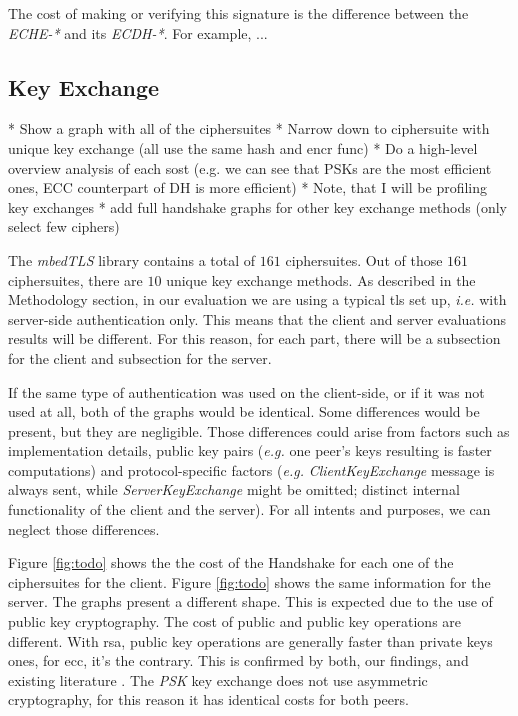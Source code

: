 \documentclass{llncs}
\begin{document}
The cost of making or verifying this signature is the difference between the \textit{ECHE-*} and its \textit{ECDH-*}.
For example, ...


\subsection{Key Exchange} 
 * Show a graph with all of the ciphersuites
* Narrow down to ciphersuite with unique key exchange (all use the same hash and encr func)
* Do a high-level overview analysis of each sost (e.g. we can see that PSKs are the most efficient ones,
ECC counterpart of DH is more efficient)
* Note, that  I will be profiling key exchanges
* add full handshake graphs for other key exchange methods (only select few ciphers)

The \textit{mbedTLS} library contains a total of $161$ ciphersuites. Out of those $161$ ciphersuites, there are
$10$ unique key exchange methods. As described in the Methodology section, in our evaluation we are using a typical \gls{tls} set up,
\textit{i.e.} with server-side authentication only. This means that the client and server evaluations results will be different.
For this reason, for each part, there will be a subsection for the client and subsection for the server. 

If the same type of authentication
was used on the client-side, or if it was not used at all, both of the graphs would be identical. Some differences would be present,
but they are negligible. Those differences could arise from factors such as implementation details, public key pairs (\textit{e.g.}
one peer's keys resulting is faster computations) and protocol-specific factors (\textit{e.g.} \textit{ClientKeyExchange}
message is always sent, while \textit{ServerKeyExchange} might be omitted; distinct internal functionality of the client 
and the server). For all intents and purposes, we can neglect those differences.

Figure \ref{fig:todo} shows the the cost of the Handshake for each one of the ciphersuites for the client. Figure
\ref{fig:todo} shows the same information for the server. The graphs present a different shape. This is expected due 
to the use of public key cryptography. The cost of public and public key operations are different. With \gls{rsa},
public key operations are generally faster than private keys ones, for \gls{ecc}, it's the contrary. This is confirmed
by both, our findings, and existing literature \cite{maletsky2015rsa}. The \textit{PSK} key exchange does not
use asymmetric cryptography, for this reason it has identical costs for both peers.
\end{document}
